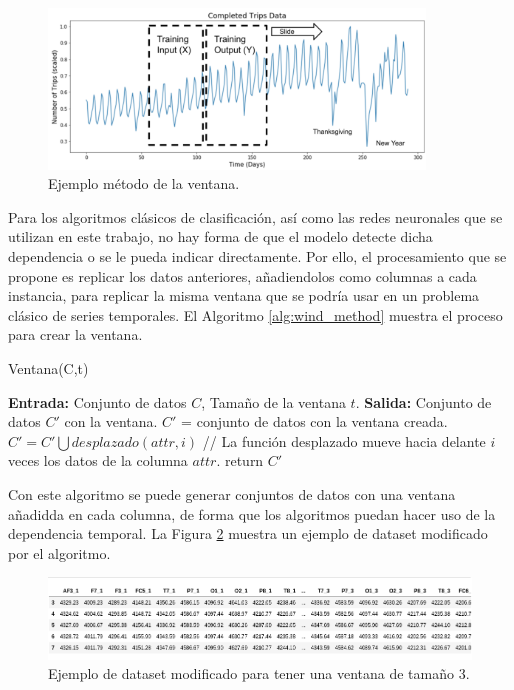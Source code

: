\begin{figure}[H]
	\centering
	\includegraphics[width=100mm]{imagenes/sliding_window_ts.png}
	\caption{Ejemplo método de la ventana.}
	\label{fig:52}
\end{figure}
\verticalspace

Para los algoritmos clásicos de clasificación, así como las redes neuronales que se utilizan en este trabajo, no hay forma de que el modelo detecte dicha dependencia o se le pueda indicar directamente. Por ello, el procesamiento que se propone es replicar los datos anteriores, añadiendolos como columnas a cada instancia, para replicar la misma ventana que se podría usar en un problema clásico de series temporales. El Algoritmo \ref{alg:wind_method} muestra el proceso para crear la ventana.\newline

\begin{algorithm}[H]
	\caption{Ventana(C,t)}
	\label{alg:wind_method}
	\begin{algorithmic}[0]
		\State \textbf{Entrada:} Conjunto de datos $C$, Tamaño de la ventana $t$.
		\State \textbf{Salida:} Conjunto de datos $C'$ con la ventana.
		\State $C'$ = conjunto de datos con la ventana creada.
				\State $C' = C' \bigcup desplazado(attr,i)$ // La función desplazado mueve hacia delante $i$ veces los datos de la columna $attr$.
			\EndFor
		\EndFor
		\State return $C'$
	\end{algorithmic}
\end{algorithm}
\verticalspace

Con este algoritmo se puede generar conjuntos de datos con una ventana añadidda en cada columna, de forma que los algoritmos puedan hacer uso de la dependencia temporal. La Figura \ref{fig:53} muestra un ejemplo de dataset modificado por el algoritmo.\newline

\begin{figure}[H]
	\centering
	\includegraphics[width=130mm]{imagenes/ventana.png}
	\caption{Ejemplo de dataset modificado para tener una ventana de tamaño 3.}
	\label{fig:53}
\end{figure}
\verticalspace

